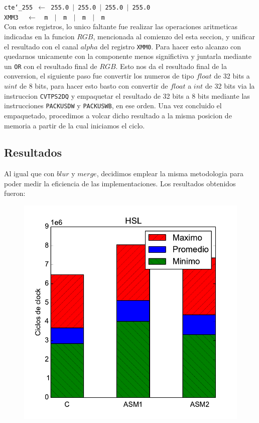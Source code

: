 \noindent
\texttt{cte\char`_255 $\gets$ 255.0 $\vert$ 255.0 $\vert$ 255.0 $\vert$ 255.0}\\
\texttt{XMM3 $\ \ \ \gets\ \ $ m $\ \ \vert\ \ $ m $\ \ \vert\ \ $ m $\ \ \vert\ \ $ m}\\

Con estos registros, lo unico faltante fue realizar las operaciones aritmeticas indicadas en la funcion $RGB$, mencionada al comienzo del esta seccion, y unificar el resultado con el canal $alpha$ del registro \texttt{XMM0}. Para hacer esto alcanzo con quedarnos unicamente con la componente menos significtiva y juntarla mediante un \texttt{OR} con el resultado final de $RGB$. Esto nos da el resultado final de la conversion, el siguiente paso fue convertir los numeros de tipo $float$ de 32 bits a $uint$ de 8 bits, para hacer esto basto con convertir de $float$ a $int$ de 32 bits via la instruccion \texttt{CVTPS2DQ} y empaquetar el resultado de 32 bits a 8 bits mediante las instrucciones \texttt{PACKUSDW} y \texttt{PACKUSWB}, en ese orden. Una vez concluido el empaquetado, procedimos a volcar dicho resultado a la misma posicion de memoria a partir de la cual iniciamos el ciclo.

\newpage
\subsection{Resultados}
Al igual que con $blur$ y $merge$, decidimos emplear la misma metodologia para poder medir la eficiencia de las implementaciones. Los resultados obtenidos fueron:

\begin{figure}[h!]
	\centering
	\includegraphics[scale=0.45]{images/hsl_comparation}
\end{figure}


